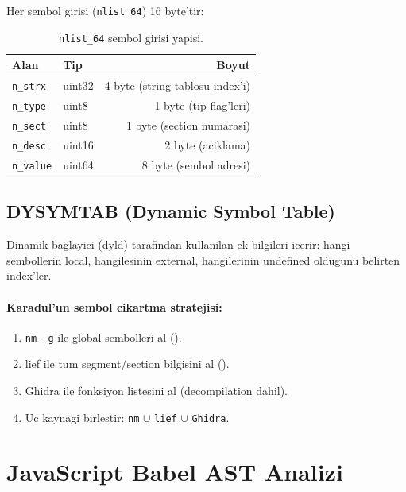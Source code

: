 Her sembol girisi (\texttt{nlist\_64}) 16 byte'tir:

\begin{table}[htbp]
\centering
\begin{tabular}{llr}
\toprule
\textbf{\color{sectioncyan}Alan} & \textbf{\color{sectioncyan}Tip} & \textbf{\color{sectioncyan}Boyut} \\
\midrule
\texttt{n\_strx}  & uint32 & 4 byte (string tablosu index'i) \\
\texttt{n\_type}  & uint8  & 1 byte (tip flag'leri) \\
\texttt{n\_sect}  & uint8  & 1 byte (section numarasi) \\
\texttt{n\_desc}  & uint16 & 2 byte (aciklama) \\
\texttt{n\_value} & uint64 & 8 byte (sembol adresi) \\
\bottomrule
\end{tabular}
\caption{\texttt{nlist\_64} sembol girisi yapisi.}
\label{tab:nlist64}
\end{table}

\subsection{DYSYMTAB (Dynamic Symbol Table)}

Dinamik baglayici (dyld) tarafindan kullanilan ek bilgileri icerir: hangi sembollerin local, hangilesinin external, hangilerinin undefined oldugunu belirten index'ler.

\paragraph{Karadul'un sembol cikartma stratejisi:}
\begin{enumerate}
\item \texttt{nm -g} ile global sembolleri al ().
\item lief ile tum segment/section bilgisini al ().
\item Ghidra ile fonksiyon listesini al (decompilation dahil).
\item Uc kaynagi birlestir: \texttt{nm} $\cup$ \texttt{lief} $\cup$ \texttt{Ghidra}.
\end{enumerate}


\section{JavaScript Babel AST Analizi}
\label{sec:babel-ast}

